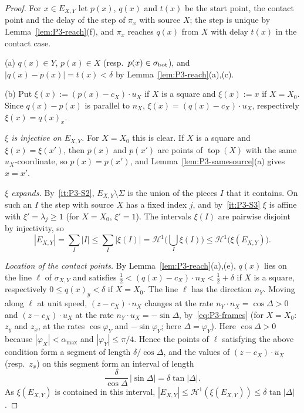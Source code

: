 \documentclass[11pt]{amsart}
\newcommand{\Top}{\operatorname{top}}
\newcommand{\amax}{\alpha_{\max}}
\theoremstyle{definition}
\theoremstyle{remark}
\numberwithin{equation}{section}
\begin{document}
\begin{proof}
For $x\in E_{X,Y}$ let $p(x)$, $q(x)$ and $t(x)$ be the start point, the contact point and the delay of the step of $\pi_x$ with source $X$; the step is unique by Lemma~\ref{lem:P3-reach}(f), and $\pi_x$ reaches $q(x)$ from $X$ with delay $t(x)$ in the contact case.

(a) $q(x)\in Y$, $p(x)\in X$ (resp.\ $p(x)\in\sigma_{\rm bot}$), and $|q(x)-p(x)|=t(x)<\delta$ by Lemma~\ref{lem:P3-reach}(a),(c).

(b) Put $\xi(x):=(p(x)-c_X)\cdot u_X$ if $X$ is a square and $\xi(x):=x$ if $X=X_0$. Since $q(x)-p(x)$ is parallel to $n_X$, $\xi(x)=(q(x)-c_X)\cdot u_X$, respectively $\xi(x)=q(x)_x$.

\emph{$\xi$ is injective on $E_{X,Y}$.} For $X=X_0$ this is clear. If $X$ is a square and $\xi(x)=\xi(x')$, then $p(x)$ and $p(x')$ are points of $\Top(X)$ with the same $u_X$-coordinate, so $p(x)=p(x')$, and Lemma~\ref{lem:P3-samesource}(a) gives $x=x'$.

\emph{$\xi$ expands.} By~\ref{it:P3-S2}, $E_{X,Y}\setminus\Sigma$ is the union of the pieces $I$ that it contains. On such an $I$ the step with source $X$ has a fixed index $j$, and by~\ref{it:P3-S3} $\xi$ is affine with $\xi'=\lambda_j\ge1$ (for $X=X_0$, $\xi'=1$). The intervals $\xi(I)$ are pairwise disjoint by injectivity, so
\[
|E_{X,Y}|=\sum_I|I|\le\sum_I|\xi(I)|=\mathcal H^1\Big(\bigcup_I\xi(I)\Big)\le\mathcal H^1\big(\xi(E_{X,Y})\big).
\]

\emph{Location of the contact points.} By Lemma~\ref{lem:P3-reach}(a),(e), $q(x)$ lies on the line $\ell$ of $\sigma_{X,Y}$ and satisfies $\frac12<(q(x)-c_X)\cdot n_X<\frac12+\delta$ if $X$ is a square, respectively $0\le q(x)_y<\delta$ if $X=X_0$. The line $\ell$ has the direction $n_Y$. Moving along $\ell$ at unit speed, $(z-c_X)\cdot n_X$ changes at the rate $n_Y\cdot n_X=\cos\Delta>0$ and $(z-c_X)\cdot u_X$ at the rate $n_Y\cdot u_X=-\sin\Delta$, by~\eqref{eq:P3-frames} (for $X=X_0$: $z_y$ and $z_x$, at the rates $\cos\varphi_Y$ and $-\sin\varphi_Y$; here $\Delta=\varphi_Y$). Here $\cos\Delta>0$ because $|\varphi_X|<\amax$ and $|\varphi_Y|\le\pi/4$. Hence the points of $\ell$ satisfying the above condition form a segment of length $\delta/\cos\Delta$, and the values of $(z-c_X)\cdot u_X$ (resp.\ $z_x$) on this segment form an interval of length
\[
\frac{\delta}{\cos\Delta}\,|\sin\Delta|=\delta\tan|\Delta| .
\]
As $\xi(E_{X,Y})$ is contained in this interval, $|E_{X,Y}|\le\mathcal H^1(\xi(E_{X,Y}))\le\delta\tan|\Delta|$.
\end{proof}
\end{document}
